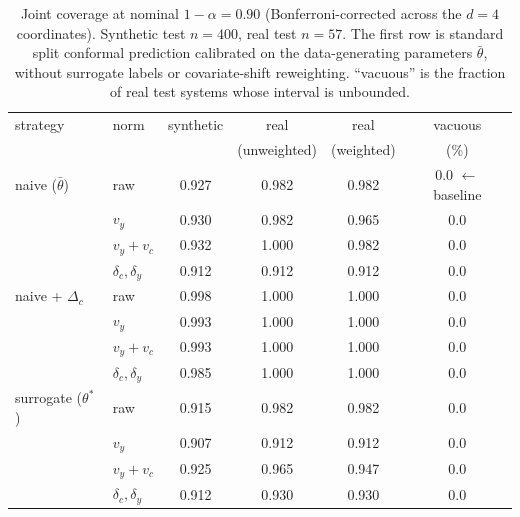 \begin{table}[t]
\centering
\small
\begin{tabular}{llcccc}
\toprule
strategy & norm & synthetic & real & real & vacuous \\
         &      &           & (unweighted) & (weighted) & (\%) \\
\midrule
naive ($\bar\theta$) & raw & 0.927 & 0.982 & 0.982 & 0.0  \quad$\leftarrow$ baseline \\
 & $v_y$ & 0.930 & 0.982 & 0.965 & 0.0 \\
 & $v_y + v_c$ & 0.932 & 1.000 & 0.982 & 0.0 \\
 & $\delta_c,\delta_y$ & 0.912 & 0.912 & 0.912 & 0.0 \\
\midrule
naive + $\Delta_c$ & raw & 0.998 & 1.000 & 1.000 & 0.0 \\
 & $v_y$ & 0.993 & 1.000 & 1.000 & 0.0 \\
 & $v_y + v_c$ & 0.993 & 1.000 & 1.000 & 0.0 \\
 & $\delta_c,\delta_y$ & 0.985 & 1.000 & 1.000 & 0.0 \\
\midrule
surrogate ($\theta^*$) & raw & 0.915 & 0.982 & 0.982 & 0.0 \\
 & $v_y$ & 0.907 & 0.912 & 0.912 & 0.0 \\
 & $v_y + v_c$ & 0.925 & 0.965 & 0.947 & 0.0 \\
 & $\delta_c,\delta_y$ & 0.912 & 0.930 & 0.930 & 0.0 \\
\bottomrule
\end{tabular}
\caption{Joint coverage at nominal $1-\alpha = 0.90$ (Bonferroni-corrected across the $d=4$ coordinates). Synthetic test $n=400$, real test $n=57$. The first row is standard split conformal prediction calibrated on the data-generating parameters $\bar\theta$, without surrogate labels or covariate-shift reweighting. ``vacuous'' is the fraction of real test systems whose interval is unbounded.}
\label{tab:cp-ablation}
\end{table}
